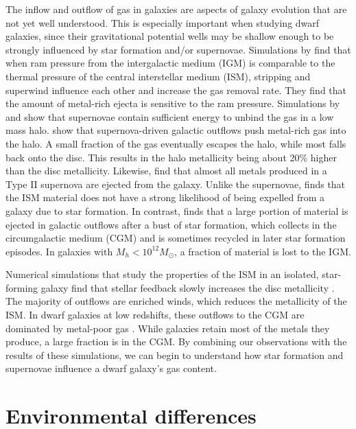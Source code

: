 The inflow and outflow of gas in galaxies are aspects of galaxy evolution that 
are not yet well understood.  This is especially important when studying dwarf 
galaxies, since their gravitational potential wells may be shallow enough to be 
strongly influenced by star formation and/or supernovae.  Simulations by 
\cite{Marcolini04} find that when ram pressure from the intergalactic medium 
(IGM) is comparable to the thermal pressure of the central interstellar medium 
(ISM), stripping and superwind influence each other and increase the gas removal 
rate.  They find that the amount of metal-rich ejecta is sensitive to the ram 
pressure.  
Simulations by \cite{Power14} and \cite{Melioli15} show that supernovae contain 
sufficient energy to unbind the gas in a low mass halo.  \cite{Hu16} show that 
supernova-driven galactic outflows push metal-rich gas into the halo.  A small 
fraction of the gas eventually escapes the halo, while most falls back onto the 
disc.  This results in the halo metallicity being about 20\% higher than the 
disc metallicity.  Likewise, \cite{Muratov17} find that almost all metals 
produced in a Type II supernova are ejected from the galaxy.
Unlike the supernovae, \cite{Melioli15} finds that the ISM material does not 
have a strong likelihood of being expelled from a galaxy due to star formation.  
In contrast, \cite{Muratov15} finds that a large portion of material is ejected 
in galactic outflows after a bust of star formation, which collects in the 
circumgalactic medium (CGM) and is sometimes recycled in later star formation 
episodes.  In galaxies with $M_h < 10^{12} M_\odot$, a fraction of material is 
lost to the IGM.

Numerical simulations that study the properties of the ISM in an isolated, 
star-forming galaxy find that stellar feedback slowly increases the disc 
metallicity \citep{Hu16}.  The majority of outflows are enriched winds, which 
reduces the metallicity of the ISM.  In dwarf galaxies at low redshifts, these 
outflows to the CGM are dominated by metal-poor gas \citep{Muratov17}.  While 
galaxies retain most of the metals they produce, a large fraction is in the CGM.  
By combining our observations with the results of these simulations, we can 
begin to understand how star formation and supernovae influence a dwarf galaxy's 
gas content.


\section{Environmental differences}


